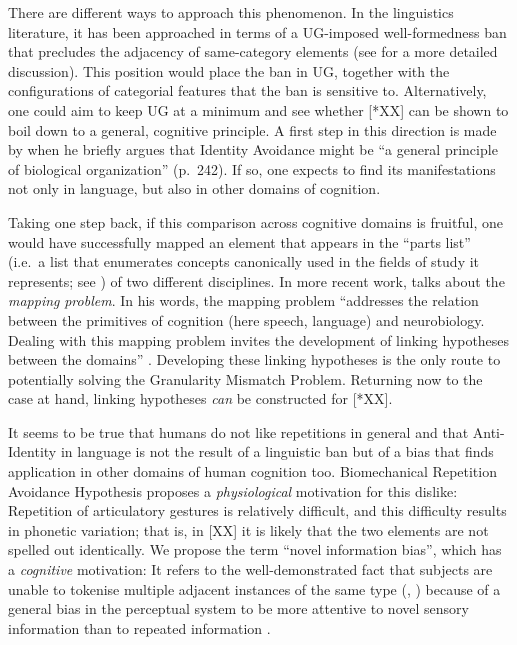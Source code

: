 \documentclass[output=paper]{langsci/langscibook}
\begin{document}
There are different ways to approach this phenomenon. In the linguistics
literature, it has been approached in terms of a UG-imposed well-formedness ban
that precludes the adjacency of same-category elements (see
\citealt{Richards2010} for a more detailed discussion). This position would
place the ban in \gls{UG}, together with the configurations of categorial
features that the ban is sensitive to. Alternatively, one could aim to keep
\gls{UG} at a minimum and see whether [*XX] can be shown to boil down to a
general, cognitive principle. A first step in this direction is made by
\citet{vanRiemsdijk2008} when he briefly argues that Identity Avoidance might
be \enquote{a general principle of biological organization} (p.\ 242). If so,
one expects to find its manifestations not only in language, but also in other
domains of cognition.

Taking one step back, if this comparison across cognitive domains is fruitful,
one would have successfully mapped an element that appears in the
\enquote{parts list} (i.e.\ a list that enumerates concepts canonically used in
the fields of study it represents; see \citealt{PoeEmb2005}) of two different
disciplines.  In more recent work, \citet{Poeppel2012} talks about the
\emph{mapping} \emph{problem}. In his words, the mapping problem “addresses the
relation between the primitives of cognition (here speech, language) and
neurobiology.  Dealing with this mapping problem invites the development of
linking hypotheses between the domains” \citep[34]{Poeppel2012}. Developing
these linking hypotheses is the only route to potentially solving the
Granularity Mismatch Problem. Returning now to the case at hand, linking
hypotheses \emph{can} be constructed for [*XX].

It seems to be true that humans do not like repetitions in general and that
Anti-Identity in language is not the result of a linguistic ban but of a bias
that finds application in other domains of human cognition too.
 Biomechanical Repetition Avoidance Hypothesis proposes a
\emph{physiological} motivation for this dislike: Repetition of articulatory
gestures is relatively difficult, and this difficulty results in phonetic
variation; that is, in [XX] it is likely that the two elements are not spelled
out identically. We propose the term \enquote{novel information bias}, which has a
\emph{cognitive} motivation: It refers to the well-demonstrated fact that
subjects are unable to tokenise multiple adjacent instances of the same type
(\citealt{TreKan1998}, \citealt{Walter2007}) because of a general bias in the
perceptual system to be more attentive to novel sensory information than to
repeated information \citep{Leivada2017}.
\end{document}
